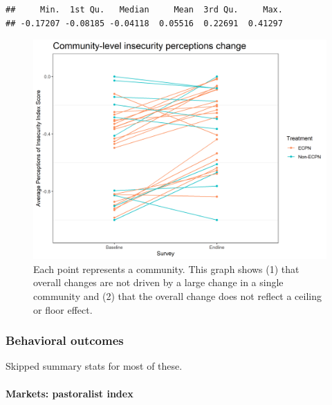 \documentclass[
]{article}
\newenvironment{Shaded}{\begin{snugshade}}{\end{snugshade}}
\newcommand{\CommentTok}[1]{\textcolor[rgb]{0.56,0.35,0.01}{\textit{#1}}}
\newcommand{\DecValTok}[1]{\textcolor[rgb]{0.00,0.00,0.81}{#1}}
\newcommand{\FunctionTok}[1]{\textcolor[rgb]{0.00,0.00,0.00}{#1}}
\newcommand{\NormalTok}[1]{#1}
\newcommand{\SpecialCharTok}[1]{\textcolor[rgb]{0.00,0.00,0.00}{#1}}
\begin{document}
\begin{verbatim}
##     Min.  1st Qu.   Median     Mean  3rd Qu.     Max. 
## -0.17207 -0.08185 -0.04118  0.05516  0.22691  0.41297
\end{verbatim}

\begin{figure}%
\centering
\includegraphics[width=\linewidth]{../survey_dat/figs/did_plots/inComm_plot_disag.png}
\caption{Each point represents a community. This graph shows (1) that overall changes are not driven by a large change in a single community and (2) that the overall change does not reflect a ceiling or floor effect.}\label{fig:in_comm_dis}
\end{figure}

\hypertarget{behavioral-outcomes}{%
\subsubsection{Behavioral outcomes}\label{behavioral-outcomes}}

Skipped summary stats for most of these.

\hypertarget{markets-pastoralist-index}{%
\paragraph{Markets: pastoralist index}\label{markets-pastoralist-index}}

\begin{Shaded}
\end{Shaded}
\end{document}
